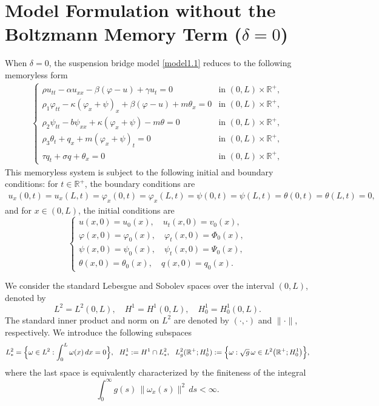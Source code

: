 \documentclass[11pt,reqno]{article}
\let\Section=\section
\def\section{\setcounter{equation}{0}\Section}
\begin{document}
\section{Model Formulation without the Boltzmann Memory Term ($\delta = 0$)} \label{sec2}
When $\delta = 0$, the suspension bridge model \eqref{model1.1} reduces to the following memoryless form
\begin{align}\label{eq:without memory}
	\begin{cases}
		\rho u_{tt} - \alpha u_{xx} - \beta(\varphi - u) + \gamma u_t = 0 & \text{in } (0,L) \times \mathbb{R}^+, \\
		\rho_1 \varphi_{tt} - \kappa(\varphi_x + \psi)_x + \beta (\varphi - u) + m \theta_x = 0 & \text{in } (0,L) \times \mathbb{R}^+, \\
		\rho_2 \psi_{tt} - b \psi_{xx} + \kappa(\varphi_x + \psi) - m \theta = 0 & \text{in } (0,L) \times \mathbb{R}^+, \\
		\rho_3 \theta_t + q_x + m (\varphi_x + \psi)_t = 0 & \text{in } (0,L) \times \mathbb{R}^+, \\
		\tau q_t + \sigma q + \theta_x = 0& \text{in } (0,L) \times \mathbb{R}^+,
	\end{cases}
\end{align}
This memoryless system is subject to the following initial and boundary conditions: for $t \in \mathbb{R}^+$, the boundary conditions are
\begin{align}\label{without memory:boundary condition}
        u_x(0,t) = u_x(L,t) = \varphi_x(0,t) = \varphi_x(L,t) = \psi(0,t) = \psi(L,t) = \theta(0,t) = \theta(L,t) = 0,
\end{align}
and for $x \in (0, L)$, the initial conditions are
\begin{equation}\label{without memory:initial condition}
 \begin{cases}
  u(x,0) = u_0(x), \quad u_t(x,0) = v_0(x), \\
  \varphi(x,0) = \varphi_0(x), \quad \varphi_t(x,0) = \Phi_0(x), \\
  \psi(x,0) = \psi_0(x), \quad \psi_t(x,0) = \Psi_0(x), \\
  \theta(x,0) = \theta_0(x), \quad q(x,0) = q_0(x).
 \end{cases}
\end{equation}

We consider the standard Lebesgue and Sobolev spaces over the interval \((0,L)\), denoted by
\[
L^2 = L^2(0,L), \quad H^1 = H^1(0,L), \quad H_0^1 = H_0^1(0,L).
\]
The standard inner product and norm on \(L^2\) are denoted by \((\cdot,\cdot)\) and \(\|\cdot\|\), respectively.
We introduce the following subspaces
\begin{align*}
	L_*^2 = \Bigl\{ \omega \in L^2 : \int_0^L \omega(x)\,dx = 0 \Bigr\}, ~~H_*^1 := H^1 \cap L_*^2, ~~L_g^2(\mathbb{R}^+; H_0^1) := \Bigl\{ \omega : \sqrt{g}\,\omega \in L^2\bigl(\mathbb{R}^+; H_0^1\bigr) \Bigr\},
\end{align*}
where the last space is equivalently characterized by the finiteness of the integral
\[
\int_0^{\infty} g(s)\, \|\omega_x(s)\|^2 \, ds < \infty .
\]
\end{document}
